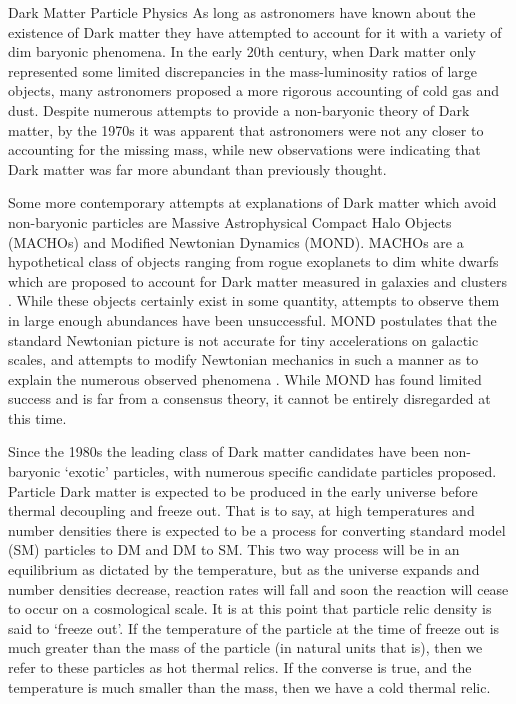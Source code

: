 \documentclass[a4paper,11pt]{article}
\begin{document}
\begin{section}{Dark Matter Particle Physics}
    As long as astronomers have known about the existence of Dark matter they have attempted to account for it with a variety of dim baryonic phenomena.
    In the early 20th century, when Dark matter only represented some limited discrepancies in the mass-luminosity ratios of large objects, many astronomers proposed a more rigorous accounting of cold gas and dust. 
    Despite numerous attempts to provide a non-baryonic theory of Dark matter, by the 1970s it was apparent that astronomers were not any closer to accounting for the missing mass, while new observations were indicating that Dark matter was far more abundant than previously thought. 

    Some more contemporary attempts at explanations of Dark matter which avoid non-baryonic particles are Massive Astrophysical Compact Halo Objects (MACHOs) and Modified Newtonian Dynamics (MOND).
    MACHOs are a hypothetical class of objects ranging from rogue exoplanets to dim white dwarfs which are proposed to account for Dark matter measured in galaxies and clusters \cite{Bertone:2018}.
    While these objects certainly exist in some quantity, attempts to observe them in large enough abundances have been unsuccessful.
    MOND postulates that the standard Newtonian picture is not accurate for tiny accelerations on galactic scales, and attempts to modify Newtonian mechanics in such a manner as to explain the numerous observed phenomena \cite{Bertone:2018}.
    While MOND has found limited success and is far from a consensus theory, it cannot be entirely disregarded at this time.

    Since the 1980s the leading class of Dark matter candidates have been non-baryonic `exotic' particles, with numerous specific candidate particles proposed. 
    Particle Dark matter is expected to be produced in the early universe before thermal decoupling and freeze out.
    That is to say, at high temperatures and number densities there is expected to be a process for converting standard model (SM) particles to DM and DM to SM.
    This two way process will be in an equilibrium as dictated by the temperature, but as the universe expands and number densities decrease, reaction rates will fall and soon the reaction will cease to occur on a cosmological scale.
    It is at this point that particle relic density is said to `freeze out'.
    If the temperature of the particle at the time of freeze out is much greater than the mass of the particle (in natural units that is), then we refer to these particles as hot thermal relics.
    If the converse is true, and the temperature is much smaller than the mass, then we have a cold thermal relic.


\end{section}
\end{document}
